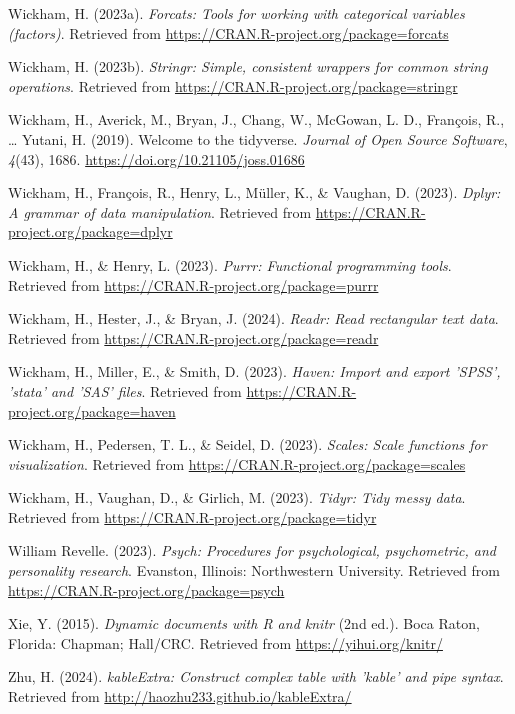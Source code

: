 \documentclass[
  man,floatsintext]{apa6}
\newlength{\cslhangindent}
\newlength{\cslentryspacingunit} %
\newenvironment{CSLReferences}[2] %
 {%
  \setlength{\parindent}{0pt}
  \ifodd #1
  \let\oldpar\par
  \def\par{\hangindent=\cslhangindent\oldpar}
  \fi
  \setlength{\parskip}{#2\cslentryspacingunit}
 }%
 {}
\begin{document}
\begin{CSLReferences}{1}{0}
\leavevmode{}%
Wickham, H. (2023a). \emph{Forcats: Tools for working with categorical variables (factors)}. Retrieved from \url{https://CRAN.R-project.org/package=forcats}

\leavevmode{}%
Wickham, H. (2023b). \emph{Stringr: Simple, consistent wrappers for common string operations}. Retrieved from \url{https://CRAN.R-project.org/package=stringr}

\leavevmode{}%
Wickham, H., Averick, M., Bryan, J., Chang, W., McGowan, L. D., François, R., \ldots{} Yutani, H. (2019). Welcome to the {tidyverse}. \emph{Journal of Open Source Software}, \emph{4}(43), 1686. \url{https://doi.org/10.21105/joss.01686}

\leavevmode{}%
Wickham, H., François, R., Henry, L., Müller, K., \& Vaughan, D. (2023). \emph{Dplyr: A grammar of data manipulation}. Retrieved from \url{https://CRAN.R-project.org/package=dplyr}

\leavevmode{}%
Wickham, H., \& Henry, L. (2023). \emph{Purrr: Functional programming tools}. Retrieved from \url{https://CRAN.R-project.org/package=purrr}

\leavevmode{}%
Wickham, H., Hester, J., \& Bryan, J. (2024). \emph{Readr: Read rectangular text data}. Retrieved from \url{https://CRAN.R-project.org/package=readr}

\leavevmode{}%
Wickham, H., Miller, E., \& Smith, D. (2023). \emph{Haven: Import and export 'SPSS', 'stata' and 'SAS' files}. Retrieved from \url{https://CRAN.R-project.org/package=haven}

\leavevmode{}%
Wickham, H., Pedersen, T. L., \& Seidel, D. (2023). \emph{Scales: Scale functions for visualization}. Retrieved from \url{https://CRAN.R-project.org/package=scales}

\leavevmode{}%
Wickham, H., Vaughan, D., \& Girlich, M. (2023). \emph{Tidyr: Tidy messy data}. Retrieved from \url{https://CRAN.R-project.org/package=tidyr}

\leavevmode{}%
William Revelle. (2023). \emph{Psych: Procedures for psychological, psychometric, and personality research}. Evanston, Illinois: Northwestern University. Retrieved from \url{https://CRAN.R-project.org/package=psych}

\leavevmode{}%
Xie, Y. (2015). \emph{Dynamic documents with {R} and knitr} (2nd ed.). Boca Raton, Florida: Chapman; Hall/CRC. Retrieved from \url{https://yihui.org/knitr/}

\leavevmode{}%
Zhu, H. (2024). \emph{kableExtra: Construct complex table with 'kable' and pipe syntax}. Retrieved from \url{http://haozhu233.github.io/kableExtra/}

\end{CSLReferences}
\end{document}
